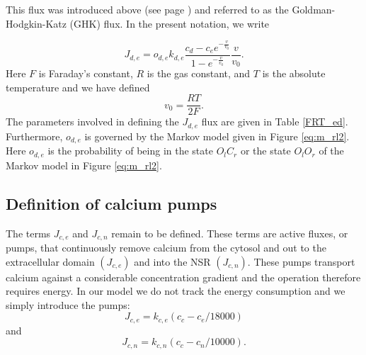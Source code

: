  This flux was introduced above (see page \pageref{GHK}) and referred to as the Goldman-Hodgkin-Katz (GHK) flux. In the present notation, we write

\begin{equation}
J_{d,e}=o_{d,e} k_{d,e} \frac{c_d-c_{e}e^{-\frac{v}{v_0}}}{1-e^{-\frac{v}{v_0}}}\frac{v}{v_0}.\label{J_ed}
\end{equation}
Here %
$F$ is Faraday's constant, $R$ is the gas constant,
and $T$ is the absolute temperature and we have defined
\[
v_0=\frac{RT}{2F}.
\]
 The parameters involved in defining the $J_{d,e}$ flux are given in Table \ref{FRT_ed}. Furthermore, $o_{d,e}$ is governed by the Markov model
 given in Figure \ref{eq:m_rl2}. Here $o_{d,e}$ is the probability of being in the state $O_lC_r$ or the state $O_lO_r$ of the Markov model
  in Figure \ref{eq:m_rl2}.








\subsection{Definition of calcium pumps}


The terms $J_{c,e}$ and $J_{c,n}$ remain to be defined. These terms are active
fluxes, or pumps, that continuously remove calcium from the cytosol
and out to the extracellular domain $(J_{c,e})$ and into the NSR $(J_{c,n}).$
These pumps transport calcium against a considerable concentration gradient and
the operation therefore requires energy. In our model we do not track the
energy consumption and we simply introduce the pumps:
\begin{equation}
J_{c,e}=k_{c,e} (c_c-c_e/18000)  \label{J_ce}
\end{equation}
and
\begin{equation}
J_{c,n}= k_{c,n} (c_c-c_n/10000).  \label{J_cn}
\end{equation}


